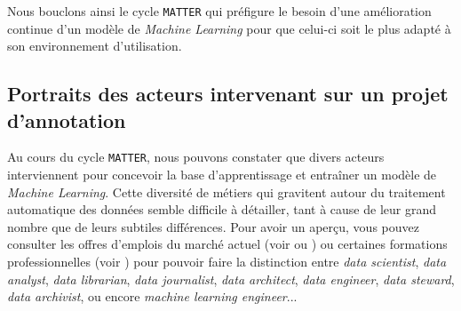 			Nous bouclons ainsi le cycle \texttt{MATTER} qui préfigure le besoin d'une amélioration continue d'un modèle de \textit{Machine Learning} pour que celui-ci soit le plus adapté à son environnement d'utilisation.
	
	
	\subsection{Portraits des acteurs intervenant sur un projet d'annotation}
	\label{section:2.2.2-ORGANISATION-ANNOTATION-ACTEURS}
	
		Au cours du cycle \texttt{MATTER}, nous pouvons constater que divers acteurs interviennent pour concevoir la base d'apprentissage et entraîner un modèle de \textit{Machine Learning}.
		Cette diversité de métiers qui gravitent autour du traitement automatique des données semble difficile à détailler, tant à cause de leur grand nombre que de leurs subtiles différences.
		Pour avoir un aperçu, vous pouvez consulter les offres d'emplois du marché actuel (voir \cite{team-datascientest:2022:metiers-data-mieux} ou \cite{databird:2023:10-metiers-data}) ou certaines formations professionnelles (voir \cite{isoz:2017:decouvrir-metiers-data}) pour pouvoir faire la distinction entre \textit{data scientist}, \textit{data analyst}, \textit{data librarian}, \textit{data journalist}, \textit{data architect}, \textit{data engineer}, \textit{data steward}, \textit{data archivist}, ou encore \textit{machine learning engineer}...
		
